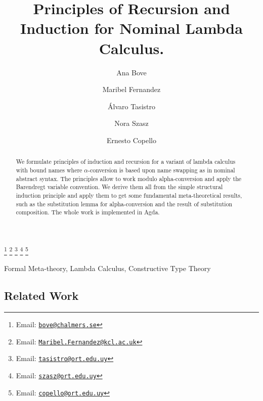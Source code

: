 \documentclass{entcs}
\newcommand{\alp}{\ensuremath{\alpha}}
\begin{document}
\begin{frontmatter}
  \title{Principles of Recursion and Induction for Nominal Lambda Calculus.}
  \author{Ana Bove }
  \address{Chalmers University of Technology\\
    Gothenburg, Sweden}
  \author{Maribel Fernandez }
  \address{King's College London\\
      London, England}
  \author{\'Alvaro Tasistro }
  \author{Nora Szasz }
  \author{Ernesto Copello }
  \address{Universidad ORT Uruguay\\
      Montevideo, Uruguay}
  \thanks[emailB]{Email: \href{mailto:bove@chalmers.se} {\texttt{\normalshape bove@chalmers.se}}}
  \thanks[emailF]{Email: \href{mailto:Maribel.Fernandez@kcl.ac.uk} {\texttt{\normalshape Maribel.Fernandez@kcl.ac.uk}}}
  \thanks[emailT]{Email: \href{mailto:tasistro@ort.edu.uy} {\texttt{\normalshape tasistro@ort.edu.uy}}} 
  \thanks[emailS]{Email: \href{mailto:szasz@ort.edu.uy} {\texttt{\normalshape szasz@ort.edu.uy}}}
  \thanks[emailC]{Email: \href{mailto:copello@ort.edu.uy} {\texttt{\normalshape copello@ort.edu.uy}}}

\begin{abstract} 
We formulate principles of induction and recursion for a variant of lambda calculus with bound names where \alp-conversion is based upon name swapping as in nominal abstract syntax. The principles allow to work modulo alpha-conversion and apply the Barendregt variable convention. We derive them all from the simple structural induction principle and apply them to get some fundamental meta-theoretical results, such as the substitution lemma for alpha-conversion and the result of substitution composition. The whole work is implemented in Agda.
\end{abstract}

\begin{keyword}
Formal Meta-theory, Lambda Calculus, Constructive Type Theory
\end{keyword}

\end{frontmatter}

\subsection{Related Work}
\label{sec:relatedWork}
\end{document}
